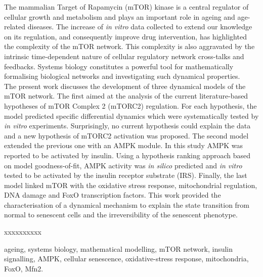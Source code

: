 


\begin{abstracts}        %
The mammalian Target of Rapamycin (mTOR) kinase is a central regulator of cellular growth and metabolism and plays an important role in ageing and age-related diseases. The increase of \emph{in vitro} data collected to extend our knowledge on its regulation, and consequently improve drug intervention, has highlighted the complexity of the mTOR network. This complexity is also aggravated by the intrinsic time-dependent nature of cellular regulatory network cross-talks and feedbacks. Systems biology constitutes a powerful tool for mathematically formalising biological networks and investigating such dynamical properties. \\
The present work discusses the development of three dynamical models of the mTOR network. The first aimed at the analysis of the current literature-based hypotheses of mTOR Complex 2 (mTORC2) regulation. For each hypothesis, the model predicted specific differential dynamics which were systematically tested by \emph{in vitro} experiments. Surprisingly, no current hypothesis could explain the data and a new hypothesis of mTORC2 activation was proposed. The second model extended the previous one with an AMPK module. In this study AMPK was reported to be activated by insulin. Using a hypothesis ranking approach based on model goodness-of-fit, AMPK activity was \emph{in silico} predicted and \emph{in vitro} tested to be activated by the insulin receptor substrate (IRS). Finally, the last model linked mTOR with the oxidative stress response, mitochondrial regulation, DNA damage and FoxO transcription factors. This work provided the characterisation of a dynamical mechanism to explain the state transition from normal to senescent cells and the irreversibility of the senescent phenotype.

\bigskip
\bigskip
\bigskip
\bigskip

\begin{my_italics_description}{xxxxxxxxxx}
  \normalfont
  \item[\text{Keywords:}] ageing, systems biology, mathematical modelling, mTOR network, insulin signalling, AMPK, cellular senescence, oxidative-stress response, mitochondria, FoxO, Mfn2.
\end{my_italics_description}


\end{abstracts}




